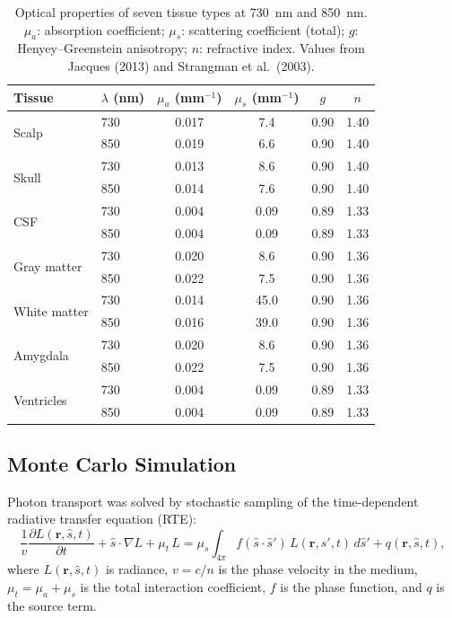 \documentclass[11pt,a4paper]{article}
\begin{document}
\begin{table}[H]
\centering
\caption{Optical properties of seven tissue types at 730~nm and 850~nm.
$\mu_a$: absorption coefficient; $\mu_s$: scattering coefficient (total);
$g$: Henyey--Greenstein anisotropy; $n$: refractive index.
Values from Jacques (2013) and Strangman et al.\ (2003).}
\label{tab:optical}
\small
\setlength{\tabcolsep}{6pt}
\begin{tabular}{llcccc}
\toprule
Tissue & $\lambda$ (nm) & $\mu_a$ (mm$^{-1}$) & $\mu_s$ (mm$^{-1}$) & $g$ & $n$ \\
\midrule
\multirow{2}{*}{Scalp}        & 730 & 0.017 & 7.4  & 0.90 & 1.40 \\
                               & 850 & 0.019 & 6.6  & 0.90 & 1.40 \\[2pt]
\multirow{2}{*}{Skull}        & 730 & 0.013 & 8.6  & 0.90 & 1.40 \\
                               & 850 & 0.014 & 7.6  & 0.90 & 1.40 \\[2pt]
\multirow{2}{*}{CSF}          & 730 & 0.004 & 0.09 & 0.89 & 1.33 \\
                               & 850 & 0.004 & 0.09 & 0.89 & 1.33 \\[2pt]
\multirow{2}{*}{Gray matter}  & 730 & 0.020 & 8.6  & 0.90 & 1.36 \\
                               & 850 & 0.022 & 7.5  & 0.90 & 1.36 \\[2pt]
\multirow{2}{*}{White matter} & 730 & 0.014 & 45.0 & 0.90 & 1.36 \\
                               & 850 & 0.016 & 39.0 & 0.90 & 1.36 \\[2pt]
\multirow{2}{*}{Amygdala}     & 730 & 0.020 & 8.6  & 0.90 & 1.36 \\
                               & 850 & 0.022 & 7.5  & 0.90 & 1.36 \\[2pt]
\multirow{2}{*}{Ventricles}   & 730 & 0.004 & 0.09 & 0.89 & 1.33 \\
                               & 850 & 0.004 & 0.09 & 0.89 & 1.33 \\
\bottomrule
\end{tabular}
\end{table}

\subsection{Monte Carlo Simulation}

Photon transport was solved by stochastic sampling of the time-dependent radiative transfer equation (RTE):
\begin{equation}
    \frac{1}{v}\frac{\partial L(\mathbf{r},\hat{s},t)}{\partial t}
    + \hat{s}\cdot\nabla L
    + \mu_t\,L
    = \mu_s\!\int_{4\pi} f(\hat{s}\cdot\hat{s}')\,L(\mathbf{r},\hat{s}',t)\,d\hat{s}'
    + q(\mathbf{r},\hat{s},t),
    \label{eq:rte}
\end{equation}
where $L(\mathbf{r},\hat{s},t)$ is radiance, $v = c/n$ is the phase velocity in the medium, $\mu_t = \mu_a + \mu_s$ is the total interaction coefficient, $f$ is the phase function, and $q$ is the source term.
\end{document}

